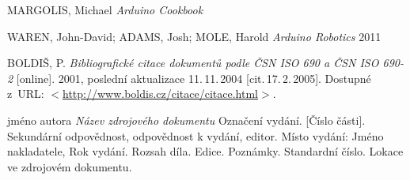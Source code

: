 \begin{literatura}{99}


    MARGOLIS, Michael
    \emph{Arduino Cookbook}

    WAREN, John-David; ADAMS, Josh; MOLE, Harold
    \emph{Arduino Robotics}
    2011
	
    BOLDIŠ, P.
    \emph{Bibliografické citace dokumentů podle ČSN ISO 690 a ČSN ISO 690-2}\/ [online].
    2001, poslední aktualizace 11.\,11.\,2004 [cit.\,17.\,2.\,2005].
    Dostupné z~URL:
    \(<\)\url{http://www.boldis.cz/citace/citace.html}\(>\).

{}
    jméno autora
    \emph{Název zdrojového dokumentu}
    Označení vydání.
    [Číslo části].
    Sekundární odpovědnost, odpovědnost k vydání, editor.
    Místo vydání: Jméno nakladatele, Rok vydání.
    Rozsah díla. Edice. 
    Poznámky. Standardní číslo.
    Lokace ve zdrojovém dokumentu.
	
\end{literatura}
